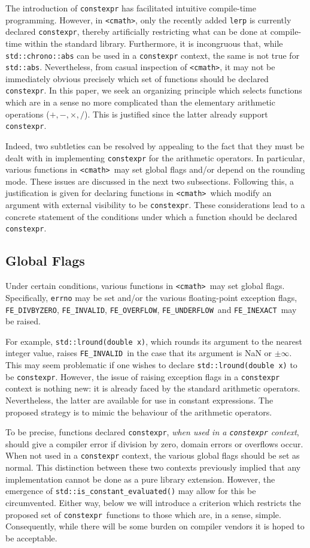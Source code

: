\documentclass[prd,twocolumn,amsmath,amssymb,nofootinbib,eqsecnum]{revtex4-1}
\newcommand{\constexpr}{\code{constexpr}\xspace}
\newcommand{\code}[1]{{\tt #1}}
\newcommand{\header}[1]{{\tt <#1>}}
\newcommand{\cmath}{\header{cmath}}
\newcommand{\FEINVALID}{{\tt FE\_INVALID}}
\newcommand{\FEDIVBYZERO}{{\tt FE\_DIVBYZERO}}
\newcommand{\FEINEXACT}{{\tt FE\_INEXACT}}
\newcommand{\FEUNDERFLOW}{{\tt FE\_UNDERFLOW}}
\newcommand{\FEOVERFLOW}{{\tt FE\_OVERFLOW}}
\newcommand{\Operators}{\ensuremath{+,-,\times,/}}
\begin{document}
The introduction of \constexpr has facilitated intuitive compile-time
programming. However, in \cmath, only the recently added \code{lerp} is currently declared \constexpr,
thereby artificially restricting what can be done at compile-time within the standard library. Furthermore, it
is incongruous that, while \code{std::chrono::abs} can be used in a \code{constexpr} context, the same is
not true for \code{std::abs}.
Nevertheless, from casual inspection of \cmath, it may
not be immediately obvious precisely which set of functions should be declared
\constexpr. In this paper, we seek an organizing principle which selects functions
which are in a sense no more complicated than the elementary arithmetic operations
(\Operators). This is justified since the latter already support \constexpr.

Indeed, two subtleties can be resolved by appealing to the fact that they must be dealt with in implementing \constexpr for the arithmetic operators. In particular, various functions in \cmath\ may set global flags and/or depend on the rounding mode. These issues are discussed in the next two subsections. Following this, a justification is given for declaring functions in \cmath\ which modify an argument with external visibility to be \constexpr. These considerations lead to a concrete statement of the conditions under which a function should be declared \constexpr.

\subsection{Global Flags}
\label{sec:global}

Under certain conditions, various functions in \cmath\ may set global flags.
Specifically, \code{errno} may be set and/or the various floating-point
exception flags, \FEDIVBYZERO, \FEINVALID, \FEOVERFLOW, \FEUNDERFLOW\ and
\FEINEXACT\ may be raised. 

For example, \code{std::lround(double x)}, which rounds its argument to the nearest integer value, raises \FEINVALID\ in the case that its argument is NaN or $\pm \infty$. This may seem problematic if one wishes to declare \code{std::lround(double x)} to be \constexpr. 
However, the issue of raising exception flags in a \constexpr context is nothing new: it is already faced by
the standard arithmetic operators. Nevertheless, the latter are available for use in constant
expressions. The proposed strategy is to mimic the behaviour of the arithmetic
operators.

To be precise, functions declared \constexpr, \emph{when used in a \constexpr
context}, should give a compiler error if division by zero, domain errors or
overflows occur. When not used in a \constexpr context, the various global
flags should be set as normal. This distinction between these two contexts previously 
implied that any implementation cannot be done as a pure library extension. However, the emergence of \code{std::is\_constant\_evaluated()} \cite{ConstEval} may allow for this be circumvented.
Either way, below
we will introduce a criterion which restricts the proposed set of \constexpr\ functions 
to those which are, in a sense, simple. Consequently, while there will be some burden 
on compiler vendors it is hoped to be acceptable. 
\end{document}
